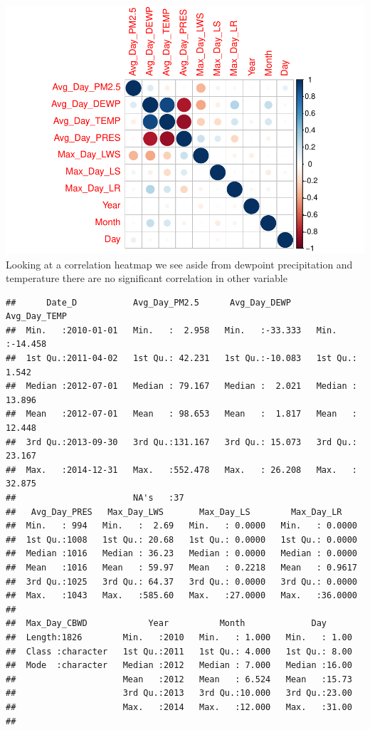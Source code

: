 \documentclass[
]{article}
\begin{document}
\includegraphics{Final_Project_1_files/figure-latex/unnamed-chunk-3-1.pdf}
Looking at a correlation heatmap we see aside from dewpoint
precipitation and temperature there are no significant correlation in
other variable

\begin{verbatim}
##      Date_D           Avg_Day_PM2.5      Avg_Day_DEWP      Avg_Day_TEMP    
##  Min.   :2010-01-01   Min.   :  2.958   Min.   :-33.333   Min.   :-14.458  
##  1st Qu.:2011-04-02   1st Qu.: 42.231   1st Qu.:-10.083   1st Qu.:  1.542  
##  Median :2012-07-01   Median : 79.167   Median :  2.021   Median : 13.896  
##  Mean   :2012-07-01   Mean   : 98.653   Mean   :  1.817   Mean   : 12.448  
##  3rd Qu.:2013-09-30   3rd Qu.:131.167   3rd Qu.: 15.073   3rd Qu.: 23.167  
##  Max.   :2014-12-31   Max.   :552.478   Max.   : 26.208   Max.   : 32.875  
##                       NA's   :37                                           
##   Avg_Day_PRES   Max_Day_LWS       Max_Day_LS        Max_Day_LR     
##  Min.   : 994   Min.   :  2.69   Min.   : 0.0000   Min.   : 0.0000  
##  1st Qu.:1008   1st Qu.: 20.68   1st Qu.: 0.0000   1st Qu.: 0.0000  
##  Median :1016   Median : 36.23   Median : 0.0000   Median : 0.0000  
##  Mean   :1016   Mean   : 59.97   Mean   : 0.2218   Mean   : 0.9617  
##  3rd Qu.:1025   3rd Qu.: 64.37   3rd Qu.: 0.0000   3rd Qu.: 0.0000  
##  Max.   :1043   Max.   :585.60   Max.   :27.0000   Max.   :36.0000  
##                                                                     
##  Max_Day_CBWD            Year          Month             Day       
##  Length:1826        Min.   :2010   Min.   : 1.000   Min.   : 1.00  
##  Class :character   1st Qu.:2011   1st Qu.: 4.000   1st Qu.: 8.00  
##  Mode  :character   Median :2012   Median : 7.000   Median :16.00  
##                     Mean   :2012   Mean   : 6.524   Mean   :15.73  
##                     3rd Qu.:2013   3rd Qu.:10.000   3rd Qu.:23.00  
##                     Max.   :2014   Max.   :12.000   Max.   :31.00  
## 
\end{verbatim}
\end{document}
